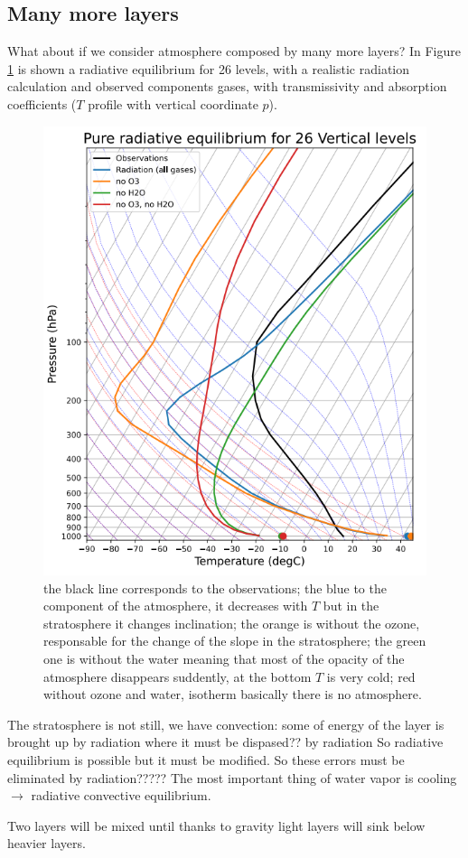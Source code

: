 \subsection{Many more layers}
What about if we consider atmosphere composed by many more layers?
In Figure \ref{fig:fig2} is shown a radiative equilibrium for 26 levels, with a realistic radiation calculation and observed components gases, with transmissivity and absorption coefficients ($T$ profile with vertical coordinate $p$).
\begin{figure}[h!]
	\centering
	\includegraphics[width=0.5\linewidth]{uploads/Screenshot 2024-11-20 130113.png}

	\caption{the black line corresponds to the observations; the blue to the component of the atmosphere, it decreases with $T$ but in the stratosphere it changes inclination; the orange is without the ozone, responsable for the change of the slope in the stratosphere; the green one is without the water meaning that most of the opacity of the atmosphere disappears suddently, at the bottom $T$ is very cold; red without ozone and water, isotherm basically there is no atmosphere.}
	\label{fig:fig2}
\end{figure}

The stratosphere is not still, we have convection: some of energy of the layer is brought up by radiation where it must be dispased?? by radiation So radiative equilibrium is possible but it must be modified. So these errors must be eliminated by radiation????? %
The most important thing of water vapor is cooling $\rightarrow$ radiative convective equilibrium.



Two layers will be mixed until thanks to gravity light layers will sink below heavier layers.
